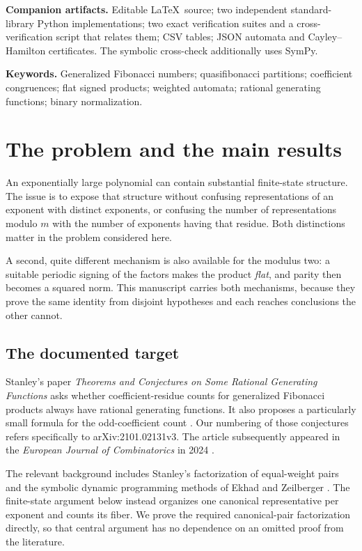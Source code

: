 \documentclass[11pt,letterpaper]{article}
\numberwithin{equation}{section}
\theoremstyle{definition}
\theoremstyle{remark}
\begin{document}
\vfill
\noindent\small
\textbf{Companion artifacts.} Editable \LaTeX\ source; two independent
standard-library Python implementations; two exact verification suites and a
cross-verification script that relates them; CSV tables; JSON automata and
Cayley--Hamilton certificates. The symbolic cross-check additionally uses
SymPy.\par
\textbf{Keywords.} Generalized Fibonacci numbers; quasifibonacci partitions;
coefficient congruences; flat signed products; weighted automata; rational
generating functions; binary normalization.

\newpage
\tableofcontents
\newpage

\section{The problem and the main results}
\label{sec:intro}

An exponentially large polynomial can contain substantial finite-state
structure. The issue is to expose that structure without confusing
representations of an exponent with distinct exponents, or confusing the
number of representations modulo $m$ with the number of exponents having
that residue. Both distinctions matter in the problem considered here.

A second, quite different mechanism is also available for the modulus two:
a suitable periodic signing of the factors makes the product \emph{flat},
and parity then becomes a squared norm. This manuscript carries both
mechanisms, because they prove the same identity from disjoint hypotheses
and each reaches conclusions the other cannot.

\subsection{The documented target}

Stanley's paper \emph{Theorems and Conjectures on Some Rational Generating
Functions} asks whether coefficient-residue counts for generalized Fibonacci
products always have rational generating functions. It also proposes a
particularly small formula for the odd-coefficient count
\cite[Conjectures 6.2 and 6.3, pp.~23--24]{Stanley}. Our numbering of those
conjectures refers specifically to arXiv:2101.02131v3. The article subsequently
appeared in the \emph{European Journal of Combinatorics} in 2024
\cite{StanleyJournal}.

The relevant background includes Stanley's factorization of equal-weight
pairs \cite[Lemma 5.2]{Stanley} and the symbolic dynamic programming methods
of Ekhad and Zeilberger \cite{EZ}. The finite-state argument below instead
organizes one canonical representative per exponent and counts its fiber.
We prove the required canonical-pair factorization directly, so that central
argument has no dependence on an omitted proof from the literature.
\end{document}

